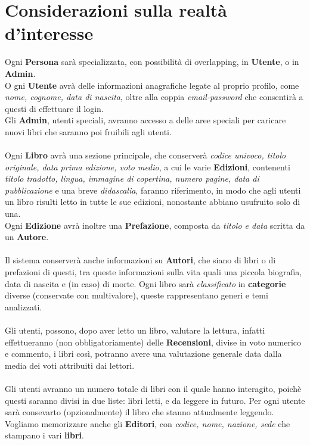 \documentclass{article}
\begin{document}
\section{Considerazioni sulla realtà d'interesse}
Ogni \textbf{Persona} sarà specializzata, con possibilità di overlapping, in \textbf{Utente}, o in \textbf{Admin}.\\
O gni \textbf{Utente} avrà delle informazioni anagrafiche legate al proprio profilo, come
\textit{nome, cognome, data di nascita}, oltre alla coppia \textit{email-password} che consentirà a questi
di effettuare il login.\\ Gli \textbf{Admin}, utenti speciali,
avranno accesso a delle aree speciali per caricare nuovi libri che saranno poi fruibili agli utenti.
\\\\
Ogni \textbf{Libro} avrà una sezione principale, che conserverà \textit{codice univoco, titolo originale, data prima edizione, voto medio}, a cui le varie \textbf{Edizioni},
contenenti \textit{titolo tradotto, lingua, immagine di copertina, numero pagine, data di pubblicazione} e una breve \textit{didascalia},
faranno riferimento, in modo che agli utenti un libro risulti letto in tutte le sue edizioni, nonostante abbiano usufruito solo di una.
\\Ogni \textbf{Edizione} avrà inoltre una \textbf{Prefazione}, composta da \textit{titolo e data} scritta
da un \textbf{Autore}.\\\\
Il sistema conserverà anche informazioni su \textbf{Autori}, che siano di libri o di prefazioni di questi, tra queste informazioni sulla vita quali
una piccola biografia, data di nascita e (in caso) di morte.
Ogni libro sarà \textit{classificato} in \textbf{categorie} diverse (conservate con multivalore), queste rappresentano generi e temi analizzati.
\\\\
Gli utenti, possono, dopo aver letto un libro, valutare la lettura, infatti effettueranno (non obbligatoriamente) delle \textbf{Recensioni}, divise in voto numerico
e commento, i libri così, potranno avere una valutazione generale data dalla media dei voti attribuiti dai lettori.
\\\\
Gli utenti avranno un numero totale di libri con il quale hanno interagito, poichè questi saranno divisi in due liste: libri letti, e da leggere
in futuro.
Per ogni utente sarà consevarto (opzionalmente) il libro che stanno attualmente leggendo.\\
Vogliamo memorizzare anche gli \textbf{Editori}, con \textit{codice, nome, nazione, sede} che stampano i vari \textbf{libri}.
\end{document}
